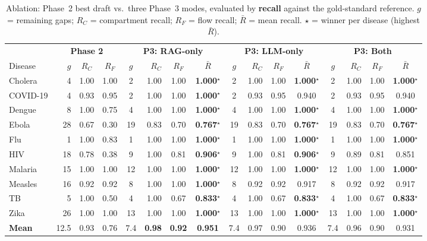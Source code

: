 \begin{table}[t]
\caption{Ablation: Phase~2 best draft vs.\ three Phase~3 modes, evaluated by
\textbf{recall} against the gold-standard reference.
$g$ = remaining gaps; $R_C$ = compartment recall; $R_F$ = flow recall;
$\bar{R}$ = mean recall. $\star$ = winner per disease (highest $\bar{R}$).}
\label{tab:ablation}
\small
\setlength{\tabcolsep}{4pt}
\begin{tabular}{lrcccrcccrcccrcc}
\toprule
 & \multicolumn{3}{c}{\textbf{Phase 2}} & \multicolumn{4}{c}{\textbf{P3: RAG-only}} & \multicolumn{4}{c}{\textbf{P3: LLM-only}} & \multicolumn{4}{c}{\textbf{P3: Both}} \\
\cmidrule(lr){2-4}\cmidrule(lr){5-8}\cmidrule(lr){9-12}\cmidrule(lr){13-16}
Disease & $g$ & $R_C$ & $R_F$ & $g$ & $R_C$ & $R_F$ & $\bar{R}$ & $g$ & $R_C$ & $R_F$ & $\bar{R}$ & $g$ & $R_C$ & $R_F$ & $\bar{R}$ \\
\midrule
Cholera      & 4  & 1.00 & 1.00 & 2 & 1.00 & 1.00 & \textbf{1.000}$^\star$ & 2 & 1.00 & 1.00 & \textbf{1.000}$^\star$ & 2 & 1.00 & 1.00 & \textbf{1.000}$^\star$ \\
COVID-19     & 4  & 0.93 & 0.95 & 2 & 1.00 & 1.00 & \textbf{1.000}$^\star$ & 2 & 0.93 & 0.95 & 0.940 & 2 & 0.93 & 0.95 & 0.940 \\
Dengue       & 8  & 1.00 & 0.75 & 4 & 1.00 & 1.00 & \textbf{1.000}$^\star$ & 4 & 1.00 & 1.00 & \textbf{1.000}$^\star$ & 4 & 1.00 & 1.00 & \textbf{1.000}$^\star$ \\
Ebola        & 28 & 0.67 & 0.30 & 19& 0.83 & 0.70 & \textbf{0.767}$^\star$ & 19& 0.83 & 0.70 & \textbf{0.767}$^\star$ & 19& 0.83 & 0.70 & \textbf{0.767}$^\star$ \\
Flu          & 1  & 1.00 & 0.83 & 1 & 1.00 & 1.00 & \textbf{1.000}$^\star$ & 1 & 1.00 & 1.00 & \textbf{1.000}$^\star$ & 1 & 1.00 & 1.00 & \textbf{1.000}$^\star$ \\
HIV          & 18 & 0.78 & 0.38 & 9 & 1.00 & 0.81 & \textbf{0.906}$^\star$ & 9 & 1.00 & 0.81 & \textbf{0.906}$^\star$ & 9 & 0.89 & 0.81 & 0.851 \\
Malaria      & 15 & 1.00 & 1.00 & 12& 1.00 & 1.00 & \textbf{1.000}$^\star$ & 12& 1.00 & 1.00 & \textbf{1.000}$^\star$ & 12& 1.00 & 1.00 & \textbf{1.000}$^\star$ \\
Measles      & 16 & 0.92 & 0.92 & 8 & 1.00 & 1.00 & \textbf{1.000}$^\star$ & 8 & 0.92 & 0.92 & 0.917 & 8 & 0.92 & 0.92 & 0.917 \\
TB           & 5  & 1.00 & 0.50 & 4 & 1.00 & 0.67 & \textbf{0.833}$^\star$ & 4 & 1.00 & 0.67 & \textbf{0.833}$^\star$ & 4 & 1.00 & 0.67 & \textbf{0.833}$^\star$ \\
Zika         & 26 & 1.00 & 1.00 & 13& 1.00 & 1.00 & \textbf{1.000}$^\star$ & 13& 1.00 & 1.00 & \textbf{1.000}$^\star$ & 13& 1.00 & 1.00 & \textbf{1.000}$^\star$ \\
\midrule
\textbf{Mean}& 12.5 & 0.93 & 0.76 & 7.4 & \textbf{0.98} & \textbf{0.92} & \textbf{0.951} & 7.4 & 0.97 & 0.90 & 0.936 & 7.4 & 0.96 & 0.90 & 0.931 \\
\bottomrule
\end{tabular}
\end{table}

